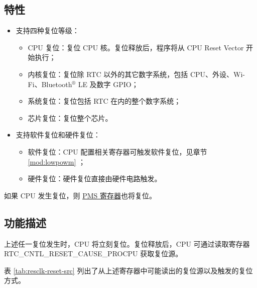 \documentclass[main\_\_CN.tex]{subfiles}
\begin{document}
\subsection{特性}
\begin{itemize}
    \item 支持四种复位等级：
    \begin{itemize}
    \item CPU 复位：复位 CPU 核。复位释放后，程序将从 CPU Reset Vector 开始执行；
    \item 内核复位：复位除 RTC 以外的其它数字系统，包括 CPU、外设、Wi-Fi、Bluetooth$^®$ LE 及数字 GPIO；
    \item 系统复位：复位包括 RTC 在内的整个数字系统；
    \item 芯片复位：复位整个芯片。
    \end{itemize}
    \item 支持软件复位和硬件复位：
    \begin{itemize}
        \item 软件复位：CPU 配置相关寄存器可触发软件复位，见章节 \ref{mod:lowpowm} \textit{}；
        \item 硬件复位：硬件复位直接由硬件电路触发。
    \end{itemize}
\end{itemize}
\begin{tiplisting}
如果 CPU 发生复位，则 \hyperref[mod:permctrl]{PMS 寄存器}也将复位。
\end{tiplisting}

\subsection{功能描述}
上述任一复位发生时，CPU 将立刻复位。复位释放后，CPU 可通过读取寄存器 RTC\_CNTL\_RESET\_CAUSE\_PROCPU 获取复位源。

表 \ref{tab:resclk-reset-src} 列出了从上述寄存器中可能读出的复位源以及触发的复位方式。
\end{document}
